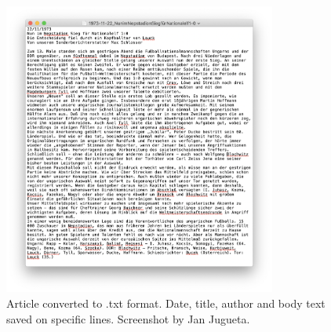 \documentclass[unknownkeysallowed,usepdftitle=false,aspectratio=169, parskip=full]{beamer}
\begin{document}
\begin{frame}
\begin{columns}[t]
\begin{column}[c]{0.45\textwidth}
\begin{figure}[h]
\includegraphics[width=0.8\textwidth,height=0.8\textheight,keepaspectratio]{figure/nuntxt.png}
\caption{Article converted to .txt format. Date, title, author and body text saved on specific lines. 
Screenshot by Jan Jugueta.}
\end{figure}
    \end{column}
    
  \end{columns}

  
\end{frame}
\end{document}

